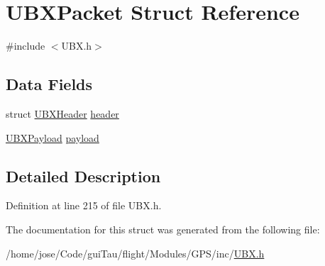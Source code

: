 \hypertarget{struct_u_b_x_packet}{\section{U\-B\-X\-Packet Struct Reference}
\label{struct_u_b_x_packet}
}


{\ttfamily \#include $<$U\-B\-X.\-h$>$}

\subsection*{Data Fields}
\begin{DoxyCompactItemize}
\item 
struct \hyperlink{struct_u_b_x_header}{U\-B\-X\-Header} \hyperlink{group___g_s_p_module_gaa1e79029fc57ab8ba520dfaf0c66f660}{header}
\item 
\hyperlink{union_u_b_x_payload}{U\-B\-X\-Payload} \hyperlink{group___g_s_p_module_ga863aa6b84efd85ac358894c6cdfc6883}{payload}
\end{DoxyCompactItemize}


\subsection{Detailed Description}


Definition at line 215 of file U\-B\-X.\-h.



The documentation for this struct was generated from the following file\-:\begin{DoxyCompactItemize}
\item 
/home/jose/\-Code/gui\-Tau/flight/\-Modules/\-G\-P\-S/inc/\hyperlink{_u_b_x_8h}{U\-B\-X.\-h}\end{DoxyCompactItemize}
